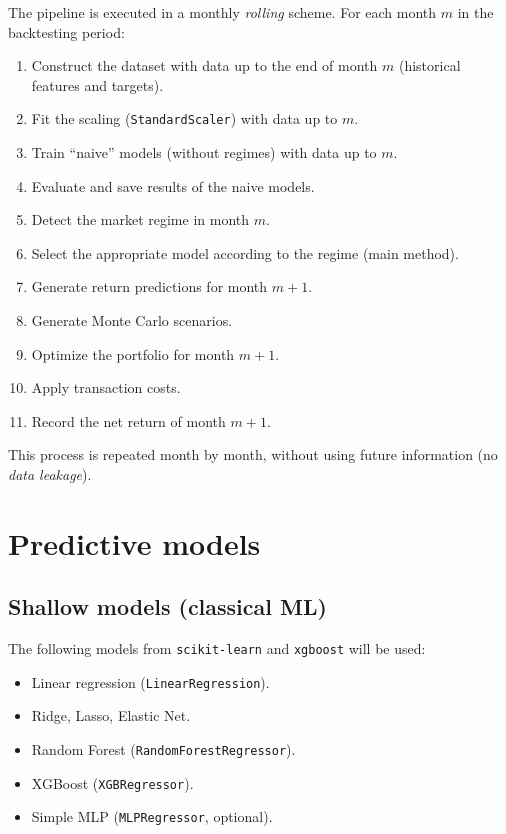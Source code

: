 \documentclass[12pt]{article}
\begin{document}
The pipeline is executed in a monthly \textit{rolling} scheme. For each month $m$ in the backtesting period:

\begin{enumerate}
    \item Construct the dataset with data up to the end of month $m$ (historical features and targets).
    \item Fit the scaling (\texttt{StandardScaler}) with data up to $m$.
    \item Train ``naive'' models (without regimes) with data up to $m$.
    \item Evaluate and save results of the naive models.
    \item Detect the market regime in month $m$.
    \item Select the appropriate model according to the regime (main method).
    \item Generate return predictions for month $m+1$.
    \item Generate Monte Carlo scenarios.
    \item Optimize the portfolio for month $m+1$.
    \item Apply transaction costs.
    \item Record the net return of month $m+1$.
\end{enumerate}

This process is repeated month by month, without using future information (no \textit{data leakage}).

\section{Predictive models}

\subsection{Shallow models (classical ML)}

The following models from \texttt{scikit-learn} and \texttt{xgboost} will be used:

\begin{itemize}
    \item Linear regression (\texttt{LinearRegression}).
    \item Ridge, Lasso, Elastic Net.
    \item Random Forest (\texttt{RandomForestRegressor}).
    \item XGBoost (\texttt{XGBRegressor}).
    \item Simple MLP (\texttt{MLPRegressor}, optional).
\end{itemize}
\end{document}
